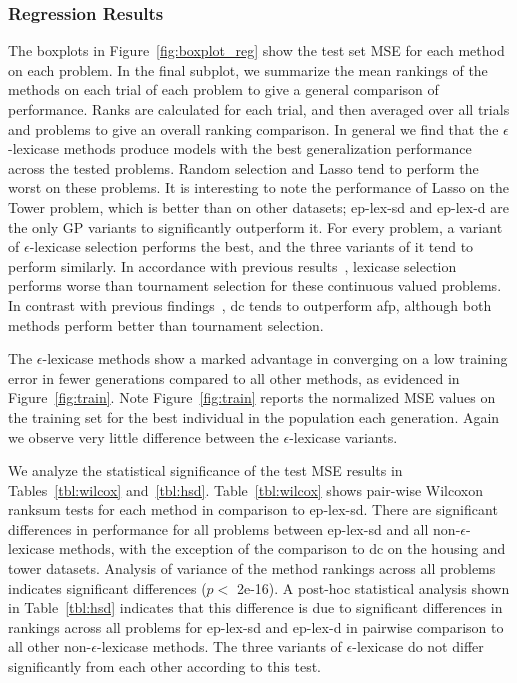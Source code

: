 \documentclass[twoside]{article}
\begin{document}
\subsubsection{Regression Results}\label{s:results}
The boxplots in Figure~\ref{fig:boxplot_reg} show the test set MSE for each method on each problem. In the final subplot, we summarize the mean rankings of the methods on each trial of each problem to give a general comparison of performance. Ranks are calculated for each trial, and then averaged over all trials and problems to give an overall ranking comparison. In general we find that the $\epsilon$-lexicase methods produce models with the best generalization performance across the tested problems. Random selection and Lasso tend to perform the worst on these problems. It is interesting to note the performance of Lasso on the Tower problem, which is better than on other datasets; ep-lex-sd and ep-lex-d are the only GP variants to significantly outperform it. For every problem, a variant of $\epsilon$-lexicase selection performs the best, and the three variants of it tend to perform similarly. In accordance with previous results~\citep{la_cava_epsilon-lexicase_2016}, lexicase selection performs worse than tournament selection for these continuous valued problems. In contrast with previous findings~\citep{schmidt_age-fitness_2011}, dc tends to outperform afp, although both methods perform better than tournament selection. 

The $\epsilon$-lexicase methods show a marked advantage in converging on a low training error in fewer generations compared to all other methods, as evidenced in Figure~\ref{fig:train}. Note Figure~\ref{fig:train} reports the normalized MSE values on the training set for the best individual in the population each generation. Again we observe very little difference between the $\epsilon$-lexicase variants. 

We analyze the statistical significance of the test MSE results in Tables~\ref{tbl:wilcox} and~\ref{tbl:hsd}. Table~\ref{tbl:wilcox} shows pair-wise Wilcoxon ranksum tests for each method in comparison to ep-lex-sd. There are significant differences in performance for all problems between ep-lex-sd and all non-$\epsilon$-lexicase methods, with the exception of the comparison to dc on the housing and tower datasets. Analysis of variance of the method rankings across all problems indicates significant differences ($p<$ 2e-16). A post-hoc statistical analysis shown in Table~\ref{tbl:hsd} indicates that this difference is due to significant differences in rankings across all problems for ep-lex-sd and ep-lex-d in pairwise comparison to all other non-$\epsilon$-lexicase methods. The three variants of $\epsilon$-lexicase do not differ significantly from each other according to this test.
\end{document}
